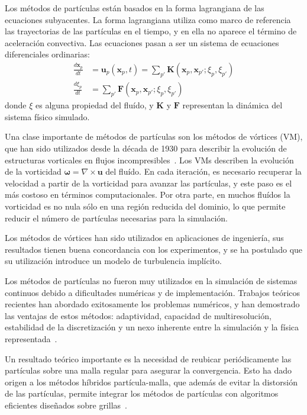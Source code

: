 \documentclass[11pt,spanish]{article}
\newcommand{\vel}{\mathbf{u}}
\newcommand{\vort}{\mathbf{\omega}}
\newcommand{\pos}{\mathbf{x}}
\begin{document}
Los métodos de partículas están basados en la forma lagrangiana de las
ecuaciones subyacentes.  La forma lagrangiana utiliza como marco de referencia
las trayectorias de las partículas en el tiempo, y en ella no aparece el término
de aceleración convectiva.  Las ecuaciones pasan a ser un sistema de ecuaciones
diferenciales ordinarias:
\begin{align}
    \frac{d\pos_p}{dt} &= \vel_p(\pos_p, t) =
        \sum_{p'} \mathbf{K}(\pos_p, \pos_{p'}; \xi_p, \xi_{p'}) \\
    \frac{d\xi_p}{dt} &=
        \sum_{p'} \mathbf{F}(\pos_p, \pos_{p'}; \xi_p, \xi_{p'})
\end{align}
donde $\xi$ es alguna propiedad del fluído, y $\mathbf{K}$ y $\mathbf{F}$ 
representan la dinámica del sistema físico simulado.

Una clase importante de métodos de partículas son los métodos de vórtices (VM),
que han sido utilizados desde la década de 1930 para describir la evolución de
estructuras vorticales en flujos incompresibles~\cite[\S2.2]{multiscale}.  Los
VMs describen la evolución de la vorticidad $\vort = \nabla\times\vel$ del
fluído.  En cada iteración, es necesario recuperar la velocidad a partir de la
vorticidad para avanzar las partículas, y este paso es el más costoso en
términos computacionales.  Por otra parte, en muchos fluídos la vorticidad es
no nula sólo en una región reducida del dominio, lo que permite reducir el
número de partículas necesarias para la simulación.

Los métodos de vórtices han sido utilizados en aplicaciones de ingeniería,
sus resultados tienen buena concordancia con los experimentos, y se ha postulado
que su utilización introduce un modelo de turbulencia implícito.

Los métodos de partículas no fueron muy utilizados en la simulación de sistemas
continuos debido a dificultades numéricas y de implementación.  Trabajos
teóricos recientes han abordado exitosamente los problemas numéricos, y han
demostrado las ventajas de estos métodos:  adaptividad, capacidad de
multiresolución, estabilidad de la discretización y un nexo inherente entre
la simulación y la física representada~\cite{ppm}.

Un resultado teórico importante es la necesidad de reubicar periódicamente
las partículas sobre una malla regular para asegurar la convergencia.  Esto ha
dado origen a los métodos híbridos partícula-malla, que además de evitar la
distorsión de las partículas, permite integrar los métodos de partículas con
algoritmos eficientes diseñados sobre grillas~\cite[\S3]{multiscale}.
\end{document}
